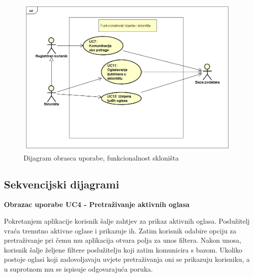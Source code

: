 					\begin{figure}[H]
						\includegraphics[scale=0.63]{dijagrami/dijagrami obrazaca uporabe/uc dijagram 2} %
						\centering
						\caption{Dijagram obrasca uporabe, funkcionalnost skloništa}
						\label{fig:ucDijagram2}
					\end{figure}
					
					\eject
				\eject		
				
			\subsection{Sekvencijski dijagrami}
				
				\textbf{Obrazac uporabe UC4 - Pretraživanje aktivnih oglasa}

				Pokretanjem aplikacije korisnik šalje zahtjev za prikaz aktivnih oglasa. Poslužitelj vraća trenutno aktivne oglase i prikazuje ih. Zatim korisnik odabire opciju za pretraživanje pri čemu mu aplikacija otvara polja za unos filtera. Nakon unosa, korisnik šalje željene filtere poslužitelju koji zatim komunicira s bazom. Ukoliko postoje oglasi koji zadovoljavaju uvjete pretraživanja oni se prikazuju korisniku, a u suprotnom mu se ispisuje odgovarajuća poruka.

